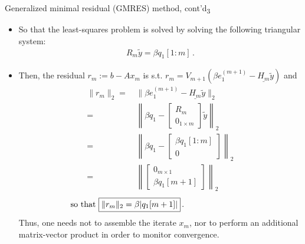 \documentclass[t,usepdftitle=false]{beamer}
\begin{document}
\begin{frame}{Generalized minimal residual (GMRES) method, cont'd\textsubscript{3}}
\begin{itemize}
\item[] So that the least-squares problem is solved by solving the following triangular system:\vspace{-.25cm}
\begin{align*}
\boxed{R_m\tilde{y}=\beta q_1[1:m]}\,.
\end{align*}
\item Then, the residual $r_m:=b-Ax_m$ is s.t. $r_m=V_{m+1}(\beta e_1^{(m+1)}-\underline{H_m}\tilde{y})$ and
\begin{align*}
\|r_m\|_2
=&\,\|\beta e_1^{(m+1)}-\underline{H_m}\tilde{y}\|_2\\
=&\,\left\|\beta q_1-\begin{bmatrix}R_m\\0_{1\times m}\end{bmatrix}\tilde{y}\right\|_2\\
=&\,\left\|\beta q_1-\begin{bmatrix}\beta q_1[1:m]\\0\end{bmatrix}\right\|_2\\
=&\,\left\|\begin{bmatrix}0_{m\times 1}\\\beta q_1[m+1]\end{bmatrix}\right\|_2
\end{align*}
\vspace{-.4cm}
\begin{align*}
\hspace{-2.8cm}\text{so that } \boxed{\|r_m\|_2=\beta|q_1[m+1]|}\,.
\end{align*}
Thus, one needs not to assemble the iterate $x_m$, nor to perform an additional matrix-vector product in order to monitor convergence.
\end{itemize}
\end{frame}
\end{document}
